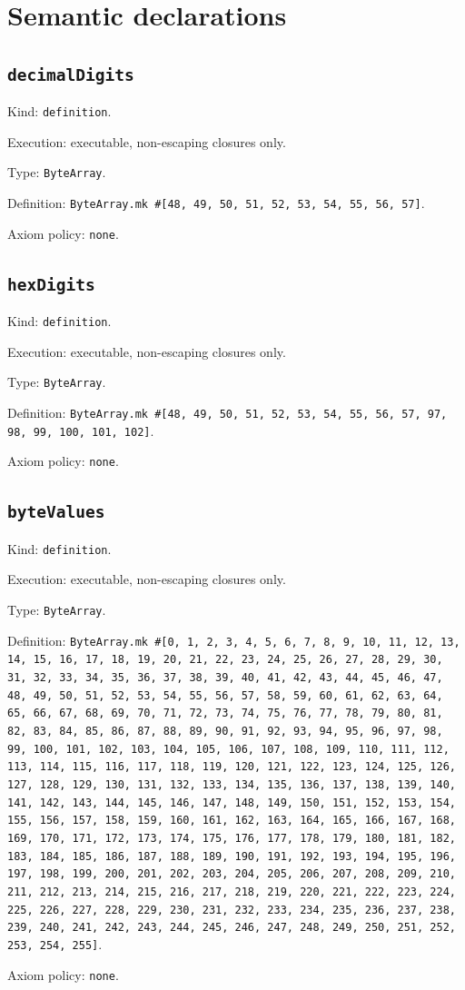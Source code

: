 \documentclass[11pt]{article}
\begin{document}
\section*{Semantic declarations}
\subsection*{\texttt{decimalDigits}}
\noindent Kind: \texttt{definition}.\par
\noindent Execution: executable, non-escaping closures only.\par
\noindent Type: \texttt{ByteArray}.\par
\noindent Definition: \texttt{ByteArray.mk \#[48, 49, 50, 51, 52, 53, 54, 55, 56, 57]}.\par
\noindent Axiom policy: \texttt{none}.\par
\subsection*{\texttt{hexDigits}}
\noindent Kind: \texttt{definition}.\par
\noindent Execution: executable, non-escaping closures only.\par
\noindent Type: \texttt{ByteArray}.\par
\noindent Definition: \texttt{ByteArray.mk \#[48, 49, 50, 51, 52, 53, 54, 55, 56, 57, 97, 98, 99, 100, 101, 102]}.\par
\noindent Axiom policy: \texttt{none}.\par
\subsection*{\texttt{byteValues}}
\noindent Kind: \texttt{definition}.\par
\noindent Execution: executable, non-escaping closures only.\par
\noindent Type: \texttt{ByteArray}.\par
\noindent Definition: \texttt{ByteArray.mk \#[0, 1, 2, 3, 4, 5, 6, 7, 8, 9, 10, 11, 12, 13, 14, 15, 16, 17, 18, 19, 20, 21, 22, 23, 24, 25, 26, 27, 28, 29, 30, 31, 32, 33, 34, 35, 36, 37, 38, 39, 40, 41, 42, 43, 44, 45, 46, 47, 48, 49, 50, 51, 52, 53, 54, 55, 56, 57, 58, 59, 60, 61, 62, 63, 64, 65, 66, 67, 68, 69, 70, 71, 72, 73, 74, 75, 76, 77, 78, 79, 80, 81, 82, 83, 84, 85, 86, 87, 88, 89, 90, 91, 92, 93, 94, 95, 96, 97, 98, 99, 100, 101, 102, 103, 104, 105, 106, 107, 108, 109, 110, 111, 112, 113, 114, 115, 116, 117, 118, 119, 120, 121, 122, 123, 124, 125, 126, 127, 128, 129, 130, 131, 132, 133, 134, 135, 136, 137, 138, 139, 140, 141, 142, 143, 144, 145, 146, 147, 148, 149, 150, 151, 152, 153, 154, 155, 156, 157, 158, 159, 160, 161, 162, 163, 164, 165, 166, 167, 168, 169, 170, 171, 172, 173, 174, 175, 176, 177, 178, 179, 180, 181, 182, 183, 184, 185, 186, 187, 188, 189, 190, 191, 192, 193, 194, 195, 196, 197, 198, 199, 200, 201, 202, 203, 204, 205, 206, 207, 208, 209, 210, 211, 212, 213, 214, 215, 216, 217, 218, 219, 220, 221, 222, 223, 224, 225, 226, 227, 228, 229, 230, 231, 232, 233, 234, 235, 236, 237, 238, 239, 240, 241, 242, 243, 244, 245, 246, 247, 248, 249, 250, 251, 252, 253, 254, 255]}.\par
\noindent Axiom policy: \texttt{none}.\par
\end{document}
